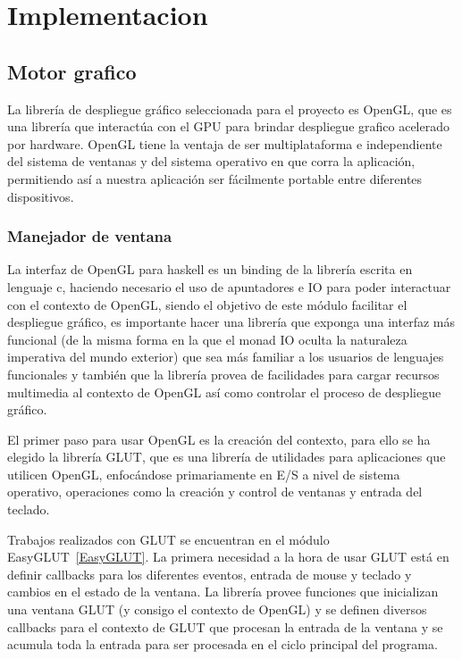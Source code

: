 
\setcounter{secnumdepth}{4}

\chapter{Implementacion}  %

\graphicspath{{implementacion/Figs/Vector/}{implementacion/Figs/}}

\section{Motor grafico}

La librería de despliegue gráfico seleccionada para el proyecto es OpenGL, que es una librería que interactúa con el GPU para brindar despliegue grafico acelerado por hardware. OpenGL tiene la ventaja de ser multiplataforma e independiente del sistema de ventanas y del sistema operativo en que corra la aplicación, permitiendo así a nuestra aplicación ser fácilmente portable entre diferentes dispositivos.

\subsection{Manejador de ventana}

La interfaz de OpenGL para haskell es un binding de la librería escrita en lenguaje c, haciendo necesario el uso de apuntadores e IO para poder interactuar con el contexto de OpenGL, siendo el objetivo de este módulo facilitar el despliegue gráfico, es importante hacer una librería que exponga una interfaz más funcional (de la misma forma en la que el monad IO oculta la naturaleza imperativa del mundo exterior) que sea más familiar a los usuarios de lenguajes funcionales y también que la librería provea de facilidades para cargar recursos multimedia al contexto de OpenGL así como controlar el proceso de despliegue gráfico.

El primer paso para usar OpenGL es la creación del contexto, para ello se ha elegido la librería GLUT, que es una librería de utilidades para aplicaciones que utilicen OpenGL, enfocándose primariamente en E/S a nivel de sistema operativo, operaciones como la creación y control de ventanas y entrada del teclado.

Trabajos realizados con GLUT se encuentran en el módulo EasyGLUT~\ref{EasyGLUT}. La primera necesidad a la hora de usar GLUT está en definir callbacks para los diferentes eventos, entrada de mouse y teclado y cambios en el estado de la ventana. La librería provee funciones que inicializan una ventana GLUT (y consigo el contexto de OpenGL) y se definen diversos callbacks para el contexto de GLUT que procesan la entrada de la ventana y se acumula toda la entrada para ser procesada en el ciclo principal del programa.

